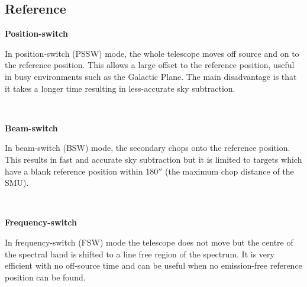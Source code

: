 \documentclass[11pt,oneside,chapters]{starlink}
\providecommand{\arcm}{\si{\arcminute}}%
\providecommand{\arcsec}{\si{\arcsecond}}%
\begin{document}
\subsection{Reference}
\begin{minipage}[t]{0.14\linewidth}
\textbf{Position-switch}
\end{minipage}
\begin{minipage}[t]{0.85\linewidth}
In position-switch (PSSW) mode, the whole telescope moves off source
and on to the reference position. This allows a large offset to the
reference position, useful in busy environments such as the Galactic
Plane. The main disadvantage is that it takes a longer time resulting
in less-accurate sky subtraction.
\end{minipage}
\vspace{0.7cm}\\
\begin{minipage}[t]{0.14\linewidth}
\textbf{Beam-switch}
\end{minipage}
\begin{minipage}[t]{0.85\linewidth}
In beam-switch (BSW) mode, the secondary chops onto the reference
position. This results in fast and accurate sky subtraction but it is
limited to targets which have a blank reference position within
180$\arcsec$ (the maximum chop distance of the SMU).
\end{minipage}
\vspace{0.7cm}\\
\begin{minipage}[t]{0.14\linewidth}
\textbf{Frequency-switch}
\end{minipage}
\begin{minipage}[t]{0.85\linewidth}
In frequency-switch (FSW) mode the telescope does not move but the
centre of the spectral band is shifted to a line free region of the
spectrum. It is very efficient with no off-source time and can be
useful when no emission-free reference position can be found.
\end{minipage}
\end{document}
